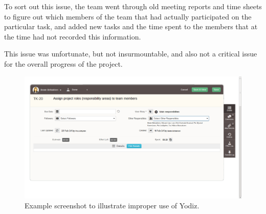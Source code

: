 To sort out this issue, the team went through old meeting reports and time sheets
to figure out which members of the team that had actually participated on the
particular task, and added new tasks and the time spent to the members that at
the time had not recorded this information.%

This issue was unfortunate, but not insurmountable, and also not a critical
issue for the overall progress of the project.

\begin{figure}[H]
\includegraphics[width=\textwidth, clip, trim=1cm 2cm 4cm 1cm]{ch/retrospect/fig/wrongUse.png}
\caption{Example screenshot to illustrate improper use of Yodiz.}
\label{fig:wrongUse}
\end{figure}
